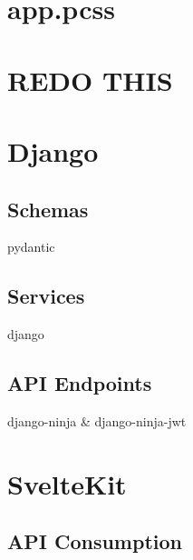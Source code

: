\section{app.pcss}

\newpage
\section{REDO THIS}
\section{Django}

\subsection{Schemas}
pydantic
\subsection{Services}
django
\subsection{API Endpoints}
django-ninja \& django-ninja-jwt

\section{SvelteKit}


\subsection{API Consumption}





